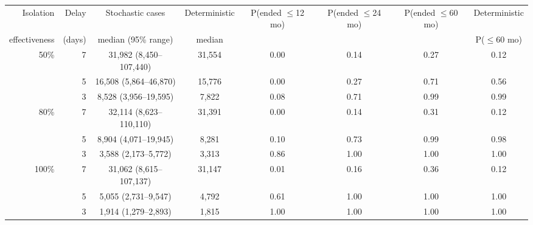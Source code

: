\begin{tabular}{@{}rrcccccc@{}}
\toprule
Isolation & Delay & Stochastic cases & Deterministic & P(ended $\le$12 mo) & P(ended $\le$24 mo) & P(ended $\le$60 mo) & Deterministic \\
effectiveness & (days) & median (95\% range) & median & & & & P($\le$60 mo) \\
\midrule
50\% & 7 & 31,982 (8,450--107,440) & 31,554 & 0.00 & 0.14 & 0.27 & 0.12 \\
 & 5 & 16,508 (5,864--46,870) & 15,776 & 0.00 & 0.27 & 0.71 & 0.56 \\
 & 3 & 8,528 (3,956--19,595) & 7,822 & 0.08 & 0.71 & 0.99 & 0.99 \\
\midrule
80\% & 7 & 32,114 (8,623--110,110) & 31,391 & 0.00 & 0.14 & 0.31 & 0.12 \\
 & 5 & 8,904 (4,071--19,945) & 8,281 & 0.10 & 0.73 & 0.99 & 0.98 \\
 & 3 & 3,588 (2,173--5,772) & 3,313 & 0.86 & 1.00 & 1.00 & 1.00 \\
\midrule
100\% & 7 & 31,062 (8,615--107,137) & 31,147 & 0.01 & 0.16 & 0.36 & 0.12 \\
 & 5 & 5,055 (2,731--9,547) & 4,792 & 0.61 & 1.00 & 1.00 & 1.00 \\
 & 3 & 1,914 (1,279--2,893) & 1,815 & 1.00 & 1.00 & 1.00 & 1.00 \\
\bottomrule
\end{tabular}
